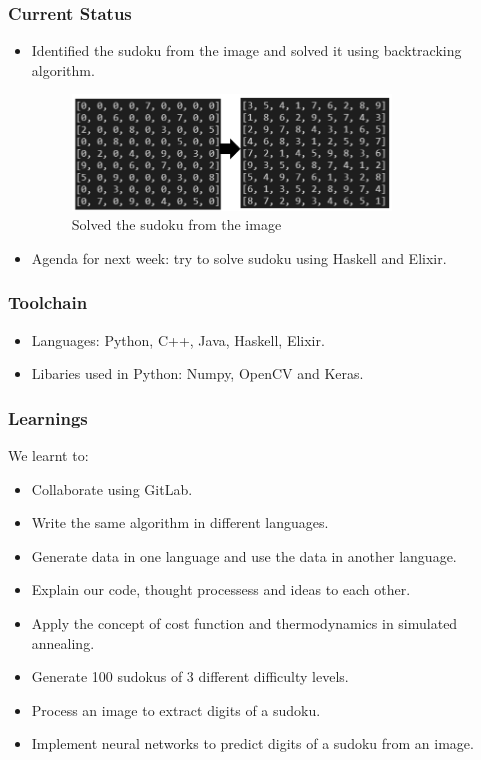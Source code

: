 \documentclass{beamer}
\begin{document}
\begin{frame}
	\frametitle{Current Status}
	\begin{itemize}
		\item Identified the sudoku from the image and solved it using backtracking algorithm.
		  \begin{figure}
			  \includegraphics[width=0.8\textwidth]{./week9_img/solve.PNG}
		  \caption{Solved the sudoku from the image}
		  \centering
		  \end{figure}
		  \item Agenda for next week: try to solve sudoku using Haskell and Elixir.
	\end{itemize}
\end{frame}

\begin{frame}
     \frametitle{Toolchain}
     \begin{itemize}
          \item Languages: Python, C++, Java, Haskell, Elixir.
          \item Libaries used in Python: Numpy, OpenCV and Keras.
     \end{itemize}
\end{frame}

\begin{frame}
     \frametitle{Learnings}
	 We learnt to:
     \begin{itemize}
		 \item Collaborate using GitLab.
		 \item Write the same algorithm in different languages.
		 \item Generate data in one language and use the data in another language.
		 \item Explain our code, thought processess and ideas to each other.
		 \item Apply the concept of cost function and thermodynamics in simulated annealing.
		 \item Generate 100 sudokus of 3 different difficulty levels.
		 \item Process an image to extract digits of a sudoku.
		 \item Implement neural networks to predict digits of a sudoku from an image.
	 \end{itemize}
\end{frame}
\end{document}
